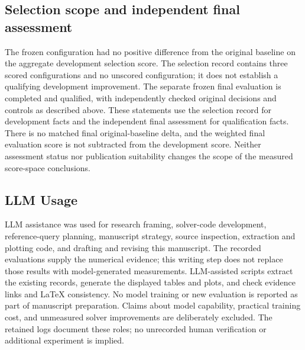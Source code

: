 \documentclass{article}
\begin{document}
\subsection{Selection scope and independent final assessment}
The frozen configuration had no positive difference from the original baseline on the aggregate development selection score. The selection record contains three scored configurations and no unscored configuration; it does not establish a qualifying development improvement. The separate frozen final evaluation is completed and qualified, with independently checked original decisions and controls as described above. These statements use the selection record for development facts and the independent final assessment for qualification facts. There is no matched final original-baseline delta, and the weighted final evaluation score is not subtracted from the development score. Neither assessment status nor publication suitability changes the scope of the measured score-space conclusions.

\subsection{LLM Usage}
LLM assistance was used for research framing, solver-code development, reference-query planning, manuscript strategy, source inspection, extraction and plotting code, and drafting and revising this manuscript. The recorded evaluations supply the numerical evidence; this writing step does not replace those results with model-generated measurements. LLM-assisted scripts extract the existing records, generate the displayed tables and plots, and check evidence links and LaTeX consistency. No model training or new evaluation is reported as part of manuscript preparation. Claims about model capability, practical training cost, and unmeasured solver improvements are deliberately excluded. The retained logs document these roles; no unrecorded human verification or additional experiment is implied.
\end{document}
